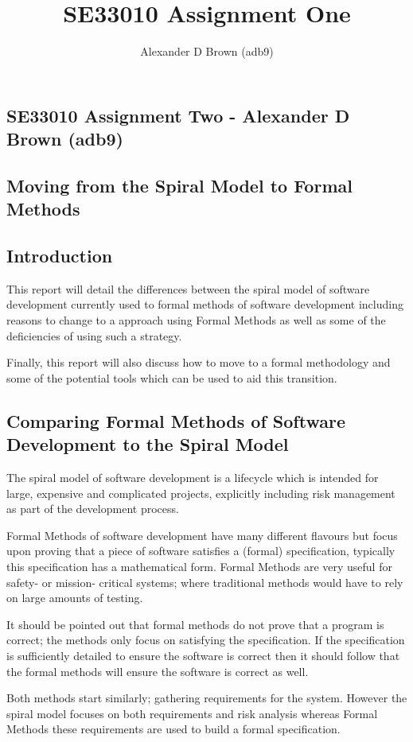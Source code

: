 \documentclass[a4paper, notitlepage, fleqn]{article}
\title{SE33010 Assignment One}
\author{Alexander D Brown (adb9)}
\begin{document}
\begin{centering}
\section*{SE33010 Assignment Two - Alexander D Brown (adb9)}
\subsection*{Moving from the Spiral Model to Formal Methods}
\end{centering}

\subsection*{Introduction}
This report will detail the differences between the spiral model of software development currently
used to formal methods of software development including reasons to change to a approach using 
Formal Methods as well as some of the deficiencies of using such a strategy.

Finally, this report will also discuss how to move to a formal methodology and some of the 
potential tools which can be used to aid this transition.

\subsection*{Comparing Formal Methods of Software Development to the Spiral Model}
The spiral model of software development is a lifecycle which is intended for large, expensive and
complicated projects, explicitly including risk management as part of the development process.

Formal Methods of software development have many different flavours but focus upon proving that a
piece of software satisfies a (formal) specification, typically this specification has a 
mathematical form. Formal Methods are very useful for safety- or mission- critical systems; where
traditional methods would have to rely on large amounts of testing.

It should be pointed out that formal methods do not prove that a program is correct; the methods
only focus on satisfying the specification. If the specification is sufficiently detailed to
ensure the software is correct then it should follow that the formal methods will ensure the
software is correct as well.

Both methods start similarly; gathering requirements for the system. However the spiral model 
focuses on both requirements and risk analysis whereas Formal Methods these requirements are used
to build a formal specification.
\end{document}
